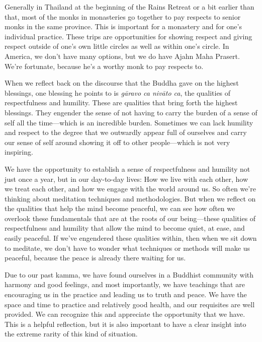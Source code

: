 Generally in Thailand at the beginning of the Rains Retreat or a bit 
earlier than that, most of the monks in monasteries go together to pay 
respects to senior monks in the same province. This is important for a 
monastery and for one's individual practice. These trips are 
opportunities for showing respect and giving respect outside of one's 
own little circles as well as within one's circle. In America, we don't 
have many options, but we do have Ajahn Maha Prasert. We're fortunate, 
because he's a worthy monk to pay respects to.

When we reflect back on the discourse that the Buddha gave on the 
highest blessings, one blessing he points to is \emph{gāravo ca 
nivāto ca}, the qualities of respectfulness and humility. These are 
qualities that bring forth the highest blessings. They engender the 
sense of not having to carry the burden of a sense of self all the 
time---which is an incredible burden. Sometimes we can lack humility 
and respect to the degree that we outwardly appear full of ourselves 
and carry our sense of self around showing it off to other 
people---which is not very inspiring.

We have the opportunity to establish a sense of respectfulness and 
humility not just once a year, but in our day-to-day lives: How we live 
with each other, how we treat each other, and how we engage with the 
world around us. So often we're thinking about meditation techniques 
and methodologies. But when we reflect on the qualities that help the 
mind become peaceful, we can see how often we overlook these 
fundamentals that are at the roots of our being---these qualities of 
respectfulness and humility that allow the mind to become quiet, at 
ease, and easily peaceful. If we've engendered these qualities within, 
then when we sit down to meditate, we don't have to wonder what 
techniques or methods will make us peaceful, because the peace is 
already there waiting for us.


Due to our past kamma, we have found ourselves in a Buddhist community 
with harmony and good feelings, and most importantly, we have teachings 
that are encouraging us in the practice and leading us to truth and 
peace. We have the space and time to practice and relatively good 
health, and our requisites are well provided. We can recognize this and 
appreciate the opportunity that we have. This is a helpful reflection, 
but it is also important to have a clear insight into the extreme 
rarity of this kind of situation.

